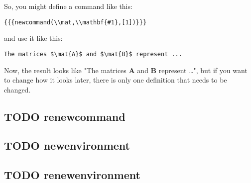 \documentclass[11pt]{article}
\newcommand{\mat}[1]{\mathbf{#1}}
\begin{document}
So, you might define a command like this:
\begin{verbatim}
{{{newcommand(\\mat,\\mathbf{#1},[1])}}}
\end{verbatim}
and use it like this:
\begin{verbatim}
The matrices $\mat{A}$ and $\mat{B}$ represent ...
\end{verbatim}

Now, the result looks like "The matrices $\mat{A}$ and $\mat{B}$
represent \ldots{}", but if you want to change how it looks later, there is
only one definition that needs to be changed.

\subsection{{\bfseries\sffamily TODO} renewcommand}
\label{sec-4-4}

\subsection{{\bfseries\sffamily TODO} newenvironment}
\label{sec-4-5}

\subsection{{\bfseries\sffamily TODO} renewenvironment}
\label{sec-4-6}
\end{document}
